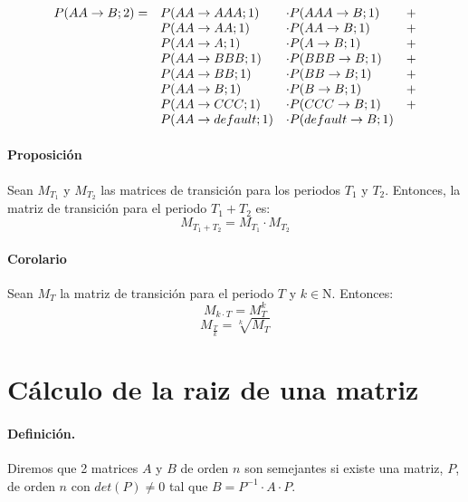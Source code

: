 \begin{displaymath}
\begin{array}{llll}
P(AA \to B;2) = & P(AA \to AAA;1)    & \cdot P(AAA \to B;1)      & + \cr
                & P(AA \to AA;1)      & \cdot P(AA \to B;1)      & + \cr
                & P(AA \to A;1)       & \cdot P(A \to B;1)       & + \cr
                & P(AA \to BBB;1)     & \cdot P(BBB \to B;1)     & + \cr
                & P(AA \to BB;1)      & \cdot P(BB \to B;1)      & + \cr
                & P(AA \to B;1)       & \cdot P(B \to B;1)       & + \cr
                & P(AA \to CCC;1)     & \cdot P(CCC \to B;1)     & + \cr
                & P(AA \to default;1) & \cdot P(default \to B;1) &
\end{array}
\end{displaymath}

\paragraph{Proposici\'on} Sean $M_{T_1}$ y $M_{T_2}$ las matrices de transici\'on
para los periodos $T_1$ y $T_2$. Entonces, la matriz de transici\'on para el
periodo $T_1+T_2$ es:
\begin{displaymath}
M_{T_1+T_2} = M_{T_1} \cdot M_{T_2}
\end{displaymath}

\paragraph{Corolario} Sean $M_{T}$ la matriz de transici\'on para el periodo 
$T$ y $k \in \mathrm{N}$. Entonces:
\begin{displaymath}
M_{k \cdot T} = M_{T}^k
\end{displaymath}
\begin{displaymath}
M_{\frac{T}{k}} = \sqrt[k]{M_{T}}
\end{displaymath}



\section{C\'alculo de la raiz de una matriz}

\paragraph{Definici\'on.}
Diremos que 2 matrices $A$ y $B$ de orden $n$ son semejantes si existe una 
matriz, $P$, de orden $n$ con $det(P) \neq 0$ tal que 
$B = P^{-1} \cdot A \cdot P$.


